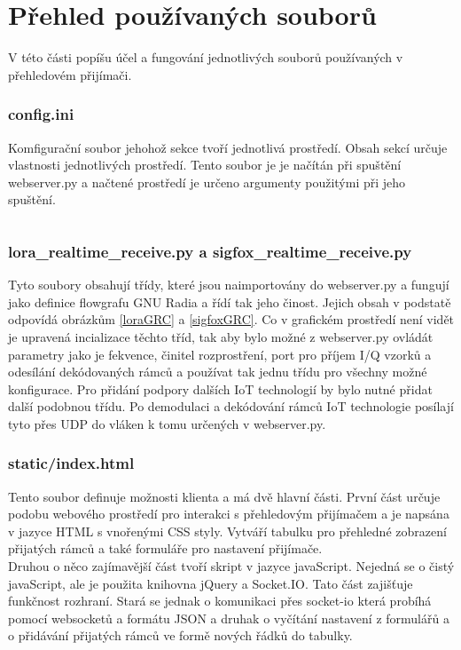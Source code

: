 \documentclass{ctuthesis}
\begin{document}
\section{Přehled používaných souborů}
V této části popíšu účel a fungování jednotlivých souborů používaných v přehledovém přijímači.

\subsubsection{config.ini}
Komfigurační soubor jehohož sekce tvoří jednotlivá prostředí. Obsah sekcí určuje vlastnosti jednotlivých prostředí. Tento soubor je je načítán při spuštění webserver.py a načtené prostředí je určeno argumenty použitými při jeho spuštění.
\begin{lstlisting}

\end{lstlisting}
\subsubsection{lora\_realtime\_receive.py a sigfox\_realtime\_receive.py}
Tyto soubory obsahují třídy, které jsou naimportovány do webserver.py a fungují jako definice flowgrafu GNU Radia a řídí tak jeho činost. Jejich obsah v podstatě odpovídá obrázkům \ref{loraGRC} a \ref{sigfoxGRC}. Co v grafickém prostředí není vidět je upravená incializace těchto tříd, tak aby bylo možné z webserver.py ovládát parametry jako je fekvence, činitel rozprostření, port pro příjem I/Q vzorků a odesílání dekódovaných rámců a používat tak jednu třídu pro všechny možné konfigurace. Pro přidání podpory dalších IoT technologií by bylo nutné přidat další podobnou třídu. Po demodulaci a dekódování rámců IoT technologie posílají tyto přes UDP do vláken k tomu určených v webserver.py.
\subsubsection{static/index.html}
Tento soubor definuje možnosti klienta a má dvě hlavní části. První část určuje podobu webového prostředí pro interakci s přehledovým přijímačem a je napsána v jazyce HTML s vnořenými CSS styly. Vytváří tabulku pro přehledné zobrazení přijatých rámců a také formuláře pro nastavení přijímače.\\
Druhou o něco zajímavější část tvoří skript v jazyce javaScript. Nejedná se o čistý javaScript, ale je použita knihovna jQuery a Socket.IO. Tato část zajišťuje funkčnost rozhraní. Stará se jednak o komunikaci přes socket-io která probíhá pomocí websocketů a formátu JSON a druhak o vyčítání nastavení z formulářů a o přidávání přijatých rámců ve formě nových řádků do tabulky.
\end{document}
